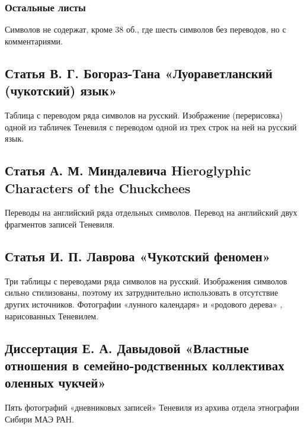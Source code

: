 \documentclass{article}
\newcounter{glyph}
\begin{document}
\subsubsection{Остальные листы}

Символов не содержат, кроме 38 об., где шесть символов без переводов, но с комментариями.

\subsection{Статья В. Г. Богораз-Тана «Луораветланский (чукотский) язык»}

Таблица с переводом ряда символов на русский. Изображение (перерисовка) одной из табличек Теневиля с переводом одной из трех строк на ней на русский язык.

\subsection{Статья А. М. Миндалевича Hieroglyphic Characters of the Chuckchees}

Переводы на английский ряда отдельных символов. Перевод на английский двух фрагментов записей Теневиля.

\subsection{Статья И. П. Лаврова «Чукотский феномен»}

Три таблицы с переводами ряда символов на русский. Изображения символов сильно стилизованы, поэтому их затруднительно использовать в отсутствие других источников. Фотографии «лунного календаря» и «родового дерева» , нарисованных Теневилем.

\subsection{Диссертация Е. А. Давыдовой «Властные отношения в семейно-родственных коллективах оленных чукчей»}

Пять фотографий «дневниковых записей» Теневиля из архива отдела этнографии Сибири МАЭ РАН.

\printbibliography
\end{document}
